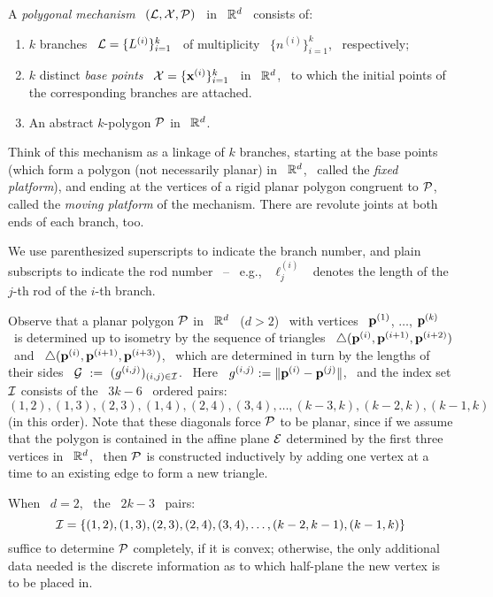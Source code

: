 \begin{defn}\label{dkmechanism}
%
A \emph{polygonal mechanism} \ $(\mathcal{L},\mathcal{X},\mathcal{P})$ \ in \ ${\mathbb R}^{d}$ \
consists of: 

\begin{enumerate}
\renewcommand{\labelenumi}{(\alph{enumi})}
%
\item $k$ branches \ $\mathcal{L}=\{L\sp{({i})}\}_{i=1}^{k}$ \ of multiplicity \
$\{n^{(i)}\}_{i=1}^{k}$, \ respectively;
%
\item $k$ distinct \emph{base points} \ $\mathcal{X}=\{\mathbf{x}\sp{({i})}\}_{i=1}^{k}$ \ in \
  ${\mathbb R}^{d}$, \ to which the initial points of the corresponding
  branches are attached.
%
\item An abstract $k$-polygon $\mathcal{P}$ in \ ${\mathbb R}^{d}$.
%
\end{enumerate}

Think of this mechanism as a linkage of $k$ branches, starting at
the base points (which form a polygon (not necessarily planar) in \
${\mathbb R}^{d}$, \ called the  \emph{fixed platform}), and ending at the
vertices of a rigid planar polygon congruent to $\mathcal{P}$, called the
\emph{moving platform} of the mechanism. There are revolute joints
at both ends of each branch, too.

We use parenthesized superscripts to
indicate the branch number, and plain subscripts to indicate the rod
number \ -- \ e.g., \ $\ell_{j}^{(i)}$ \ denotes the length of the
$j$-th rod of the $i$-th branch.
%
\end{defn}

\begin{remark}\label{rpolygon}
%
Observe that a planar polygon $\mathcal{P}$ in \ ${\mathbb R}^{d}$ \ ($d>2$) \ with
vertices \ $\mathbf{p}\sp{({1})}$, $\dotsc$, $\mathbf{p}\sp{({k})}$ \ is determined up to
isometry by the sequence of triangles \
$\triangle(\mathbf{p}\sp{({i})},\mathbf{p}\sp{({i+1})},\mathbf{p}\sp{({i+2})})$ \ and \
$\triangle(\mathbf{p}\sp{({i})},\mathbf{p}\sp{({i+1})},\mathbf{p}\sp{({i+3})})$, \ which are determined
in turn by the lengths of their sides \
$\mathcal{G}~:=~(g\sp{({i,j})})_{(i,j)\in\mathcal{I}}$. \ Here \
$g\sp{({i,j})}:=\|\mathbf{p}\sp{({i})}-\mathbf{p}\sp{({j})}\|$,  \ and the index set $\mathcal{I}$
consists of the \ $3k-6$ \ ordered pairs: \newnot{3-4}
$$
(1,2),(1,3),(2,3),(1,4),(2,4),(3,4),\dotsc,(k-3,k),(k-2,k),(k-1,k)
$$
%
(in this order). Note that these diagonals force $\mathcal{P}$ to be planar, since
if we assume that the polygon is contained in the affine plane $\mathcal{E}$
determined by the first three vertices in \ ${\mathbb R}^{d}$, \ then $\mathcal{P}$ is
constructed inductively by adding one vertex at a time to an existing
edge to form a new triangle.


When \ $d=2$, \ the \ $2k-3$ \ pairs:
$$
\mathcal{I}=\{(1,2),(1,3),(2,3),(2,4),(3,4),\dotsc,(k-2,k-1),(k-1,k)\}
$$
%
suffice to determine $\mathcal{P}$ completely, if it is convex; otherwise, the
only additional data needed is the discrete information as to which
half-plane the new vertex is to be placed in.
%
\end{remark}

